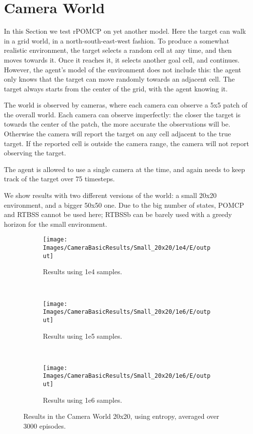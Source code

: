 \clearpage
\section{Camera World}

In this Section we test rPOMCP on yet another model. Here the target can walk in a grid world, in a
north-south-east-west fashion. To produce a somewhat realistic environment, the target selects a
random cell at any time, and then moves towards it. Once it reaches it, it selects another goal
cell, and continues. However, the agent's model of the environment does not include this: the agent
only knows that the target can move randomly towards an adjacent cell. The target always starts from
the center of the grid, with the agent knowing it.

The world is observed by cameras, where each camera can observe a 5x5 patch of the overall world.
Each camera can observe imperfectly: the closer the target is towards the center of the patch, the
more accurate the observations will be. Otherwise the camera will report the target on any cell
adjacent to the true target. If the reported cell is outside the camera range, the camera will not
report observing the target.

The agent is allowed to use a single camera at the time, and again needs to keep track of the target
over 75 timesteps.

We show results with two different versions of the world: a small 20x20 environment, and a bigger
50x50 one. Due to the big number of states, POMCP and RTBSS cannot be used here; RTBSSb can be
barely used with a greedy horizon for the small environment.

\begin{figure}[ht]
        \centering
        \begin{subfigure}[t]{0.3\textwidth}
                \texttt{[image: Images/CameraBasicResults/Small\_20x20/1e4/E/output]}
                \caption{Results using 1e4 samples.}
                \label{fig:cws4e}
        \end{subfigure}%
        ~ %
        \begin{subfigure}[t]{0.3\textwidth}
                \texttt{[image: Images/CameraBasicResults/Small\_20x20/1e6/E/output]}
                \caption{Results using 1e5 samples.}
                \label{fig:cws5e}
        \end{subfigure}
        ~ %
        \begin{subfigure}[t]{0.3\textwidth}
                \texttt{[image: Images/CameraBasicResults/Small\_20x20/1e6/E/output]}
                \caption{Results using 1e6 samples.}
                \label{fig:cws6e}
        \end{subfigure}
        \caption{Results in the Camera World 20x20, using entropy, averaged over 3000 episodes.}\label{fig:cwse}
\end{figure}

